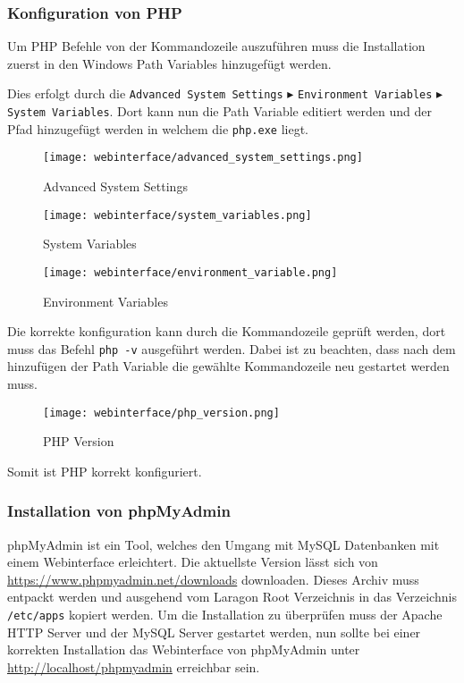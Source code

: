 \subsubsection{Konfiguration von PHP}
Um PHP Befehle von der Kommandozeile auszuführen muss die Installation zuerst in
den Windows Path Variables hinzugefügt werden.

Dies erfolgt durch die \verb|Advanced System Settings| $\blacktriangleright$
\verb|Environment Variables| $\blacktriangleright$ \verb|System Variables|. Dort
kann nun die Path Variable editiert werden und der Pfad hinzugefügt werden in
welchem die \verb|php.exe| liegt.

\begin{figure}[H]
  \centering
  \texttt{[image: webinterface/advanced\_system\_settings.png]}
  \caption{Advanced System Settings}
\end{figure}

\begin{figure}[H]
  \centering
  \texttt{[image: webinterface/system\_variables.png]}
  \caption{System Variables}
\end{figure}

\begin{figure}[H]
  \centering
  \texttt{[image: webinterface/environment\_variable.png]}
  \caption{Environment Variables}
\end{figure}

Die korrekte konfiguration kann durch die Kommandozeile geprüft werden, dort
muss das Befehl \verb|php -v| ausgeführt werden. Dabei ist zu beachten, dass
nach dem hinzufügen der Path Variable die gewählte Kommandozeile neu gestartet
werden muss.

\begin{figure}[H]
  \centering
  \texttt{[image: webinterface/php\_version.png]}
  \caption{PHP Version}
\end{figure}

Somit ist PHP korrekt konfiguriert.


\subsubsection{Installation von phpMyAdmin}
phpMyAdmin ist ein Tool, welches den Umgang mit MySQL Datenbanken mit einem
Webinterface erleichtert. Die aktuellste Version lässt sich von
\url{https://www.phpmyadmin.net/downloads} downloaden. Dieses Archiv muss
entpackt werden und ausgehend vom Laragon Root Verzeichnis in das Verzeichnis
\verb|/etc/apps| kopiert werden. Um die Installation zu überprüfen muss der
Apache HTTP Server und der MySQL Server gestartet werden, nun sollte bei einer
korrekten Installation das Webinterface von phpMyAdmin unter
\url{http://localhost/phpmyadmin} erreichbar sein.

